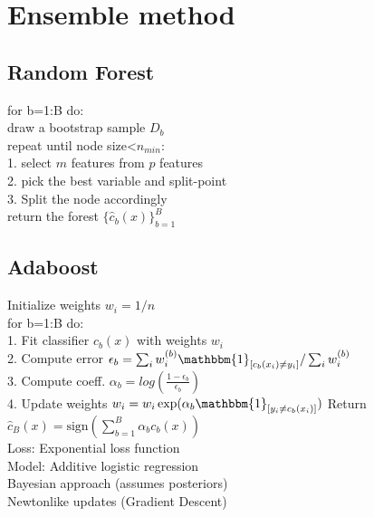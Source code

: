 \section{Ensemble method}
\subsection*{Random Forest}
for b=1:B do:\\
draw a bootstrap sample $D_b$\\
repeat until node size<$n_{min}$:\\
1. select $m$ features from $p$ features\\
2. pick the best variable and split-point\\
3. Split the node accordingly\\
return the forest $\{\hat{c}_b(x)\}_{b=1}^B$

\subsection*{Adaboost}
Initialize weights $w_i = 1/n$\\
for b=1:B do:\\
1. Fit classifier $c_b(x)$ with weights $w_i$\\
2. Compute error $\epsilon_b = \sum_i w_i^{(b)} \mathbbm{1}_{[c_b(x_i) \not = y_i]} / \sum_i w_i^{(b)}$\\
3. Compute coeff. $\alpha_b = log(\frac{1-\epsilon_b}{\epsilon_b})$\\
4. Update weights $w_i = w_i \exp(\alpha_b \mathbbm{1}_{[y_i \not = c_b(x_i)]})$
Return $\hat{c}_B(x) = \text{sign} \left ( \sum_{b=1}^B \alpha_b c_b(x) \right )$\\
Loss: Exponential loss function\\
Model: Additive logistic regression\\
Bayesian approach (assumes posteriors)\\
Newtonlike updates (Gradient Descent)

\newpage

